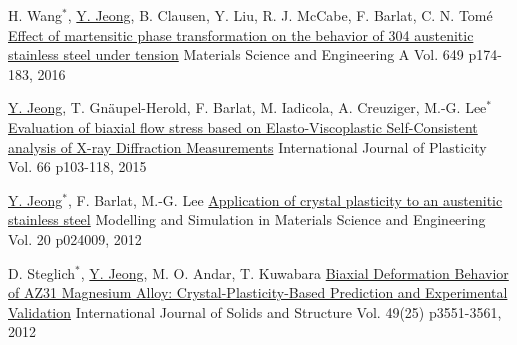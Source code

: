 \begin{cventries}
  \cventry
  {H. Wang$^*$, \underline{Y. Jeong}, B. Clausen, Y. Liu, R. J. McCabe, F. Barlat, C. N. Tom\'{e}}
  {\href{http://dx.doi.org/10.1016/j.msea.2015.09.108}{Effect of martensitic phase transformation on the behavior of 304 austenitic stainless steel under tension}}
  {Materials Science and Engineering A }
  {Vol. 649 p174-183, 2016}
  {
  }

  \cventry
  {\underline{Y. Jeong}, T. Gn\"{a}upel-Herold, F. Barlat, M. Iadicola, A. Creuziger, M.-G. Lee$^*$}
  {\href{http://dx.doi.org/10.1016/j.ijplas.2014.06.009}{Evaluation of biaxial flow stress based on Elasto-Viscoplastic Self-Consistent analysis of X-ray Diffraction Measurements}}
  {International Journal of Plasticity}
  {Vol. 66 p103-118, 2015}
  {
  }

  \cventry
  {\underline{Y. Jeong}$^*$, F. Barlat, M.-G. Lee}
  {\href{http://dx.doi.org/10.1088/0965-0393/20/2/024009}{Application of crystal plasticity to an austenitic stainless steel}}
  {Modelling and Simulation in Materials Science and Engineering}
  {Vol. 20 p024009, 2012}
  {
  }

  \cventry
  {D. Steglich$^*$, \underline{Y. Jeong}, M. O. Andar, T. Kuwabara}
  {\href{http://dx.doi.org/10.1016/j.ijsolstr.2012.06.017}{Biaxial Deformation Behavior of AZ31 Magnesium Alloy: Crystal-Plasticity-Based Prediction and Experimental Validation}}
  {International Journal of Solids and Structure}
  {Vol. 49(25) p3551-3561, 2012}
  {
  }
\item

\end{cventries}




